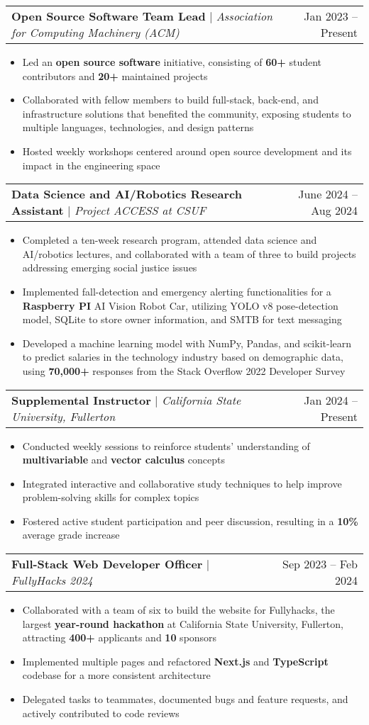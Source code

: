 \documentclass[letterpaper,11pt]{article}
\makeatletter
\newcommand{\resumeItem}[1]{
  \item\small{
    {#1 \vspace{-2pt}}
  }
}
\newcommand{\resumeProjectHeading}[2]{
  \item
  \begin{tabular*}{0.97\textwidth}{l@{\extracolsep{\fill}}r}
    \small#1 & #2 \\
  \end{tabular*}\vspace{-7pt}
}
\newcommand{\resumeItemListStart}{\begin{itemize}}
\newcommand{\resumeItemListEnd}{\end{itemize}\vspace{-5pt}}
\makeatother
\begin{document}
\resumeProjectHeading
{\textbf{Open Source Software Team Lead} $|$
  \footnotesize\emph{Association for Computing Machinery (ACM)}}{Jan 2023
  -- Present}
\resumeItemListStart
\resumeItem{Led an \textbf{open source software} initiative, consisting of \textbf{60+} student contributors and \textbf{20+} maintained projects}
\resumeItem{Collaborated with fellow members to build full-stack, back-end, and infrastructure solutions that benefited the community, exposing students to multiple languages, technologies, and design patterns}
\resumeItem{Hosted weekly workshops centered around open source development and its impact in the engineering space}
\resumeItemListEnd

\resumeProjectHeading
{\textbf{Data Science and AI/Robotics Research Assistant} $|$
  \footnotesize\emph{Project ACCESS at CSUF}}{June 2024 -- Aug 2024}
\resumeItemListStart
\resumeItem{Completed a ten-week research program, attended data science and AI/robotics lectures, and collaborated with a team of three to build projects addressing emerging social justice issues}
\resumeItem{Implemented fall-detection and emergency alerting functionalities for a \textbf{Raspberry PI} AI Vision Robot Car, utilizing YOLO v8 pose-detection model, SQLite to store owner information, and SMTB for text messaging}
\resumeItem{Developed a machine learning model with NumPy, Pandas, and scikit-learn to predict salaries in the technology industry based on demographic data, using \textbf{70,000+} responses from the Stack Overflow 2022 Developer Survey}
\resumeItemListEnd

\resumeProjectHeading
{\textbf{Supplemental Instructor} $|$
 \footnotesize\emph{California State University, Fullerton}}{Jan 2024
  -- Present} 
\resumeItemListStart
\resumeItem{Conducted weekly sessions to reinforce students' understanding of \textbf{multivariable} and \textbf{vector calculus} concepts}
\resumeItem{Integrated interactive and collaborative study techniques to help improve problem-solving skills for complex topics}
\resumeItem{Fostered active student participation and peer discussion, resulting in a \textbf{10\%} average grade increase}
\resumeItemListEnd

\resumeProjectHeading
{\textbf{Full-Stack Web Developer Officer} $|$ \footnotesize\emph{FullyHacks 2024}}{Sep 2023 -- Feb 2024}
\resumeItemListStart
\resumeItem{Collaborated with a team of six to build the website for Fullyhacks, the largest \textbf{year-round hackathon} at California State University, Fullerton, attracting \textbf{400+} applicants and \textbf{10} sponsors}
\resumeItem{Implemented multiple pages and refactored \textbf{Next.js} and \textbf{TypeScript} codebase for a more consistent architecture}
\resumeItem{Delegated tasks to teammates, documented bugs and feature requests, and actively contributed to code reviews}
\resumeItemListEnd
\end{document}
